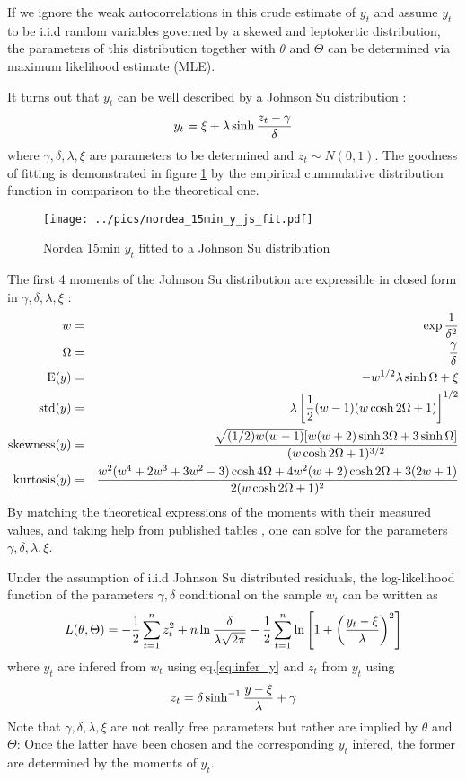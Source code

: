 \documentclass{book}
\begin{document}
If we ignore the weak autocorrelations in this crude estimate of
$y_t$ and assume $y_t$ to be i.i.d random variables governed
by a skewed and leptokertic distribution, the parameters of this
distribution together with $\theta$ and $\Theta$ can be determined via
maximum likelihood estimate (MLE).

It turns out that $y_t$ can be well described by a Johnson Su
distribution \cite{Shang2004}:
\[
  y_t = \xi + \lambda\sinh{z_t - \gamma \over \delta}
\]
where $\gamma, \delta, \lambda, \xi$ are parameters to be determined
and $z_t \sim N(0, 1)$. The goodness of fitting is demonstrated in
figure \ref{fig:nordea_15min_y_js_fit} by the
empirical cummulative distribution function in comparison to the
theoretical one.
\begin{figure}[htb!]
  \centering
    \texttt{[image: ../pics/nordea\_15min\_y\_js\_fit.pdf]}
    \caption{Nordea 15min $y_t$ fitted to a Johnson Su distribution}
    \label{fig:nordea_15min_y_js_fit}
\end{figure}

The first 4 moments of the Johnson Su distribution are expressible
in closed form in $\gamma, \delta, \lambda, \xi$ \cite{Shang2004}:
\begin{eqnarray*}
  w &=& \exp{1 \over \delta^2} \\
  \Omega &=& {\gamma \over \delta} \\
  \text{E}(y) &=& -w^{1/2} \lambda \sinh\Omega + \xi\\
  \text{std}(y) &=& \lambda \left[{1 \over 2}(w-1)(w\cosh 2\Omega +
    1)\right]^{1/2} \\
  \text{skewness}(y) &=& {
    \sqrt{(1/2)w(w-1)} [w(w+2)\sinh 3\Omega + 3\sinh\Omega]
    \over
    (w\cosh 2\Omega + 1)^{3/2}} \\
  \text{kurtosis}(y) &=& {
    w^2(w^4 + 2w^3 + 3w^2 - 3)\cosh 4\Omega + 4w^2 (w+2) \cosh 2\Omega
    + 3(2w+1) \over
    2(w\cosh 2\Omega + 1)^2 }
\end{eqnarray*}
By matching the theoretical expressions of the moments with their
measured values, and taking help from published tables
\cite{Johnson1965}, one can solve for the parameters $\gamma, \delta,
\lambda, \xi$.

Under the assumption of i.i.d Johnson Su distributed residuals, the
log-likelihood function of the parameters $\gamma, \delta$
conditional on the sample $w_t$ can be written as
\[
L(\theta, \Theta) = -{1 \over 2}\sum_{t=1}^n z_t^2 + n \ln{\delta
  \over \lambda \sqrt{2\pi}} - {1 \over 2}\sum_{t=1}^n \ln\left[
  1 + \left({y_t - \xi \over \lambda}\right)^2
\right]
\]
where $y_t$ are infered from $w_t$ using eq.\ref{eq:infer_y}
and $z_t$ from $y_t$ using
\[
z_t = \delta \sinh^{-1}{y - \xi \over \lambda} + \gamma
\]
Note that $\gamma, \delta, \lambda, \xi$ are not really free
parameters but rather are implied by $\theta$ and $\Theta$: Once the
latter have been chosen and the corresponding $y_t$ infered, the
former are determined by the moments of $y_t$.
\end{document}
